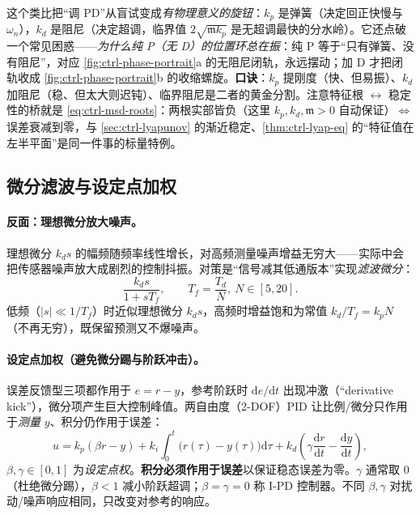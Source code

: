\begin{insight}
这个类比把“调 PD”从盲试变成\emph{有物理意义的旋钮}：$k_p$ 是弹簧（决定回正快慢与 $\omega_n$），$k_d$ 是阻尼（决定超调，临界值 $2\sqrt{\mathfrak m k_p}$ 是无超调最快的分水岭）。它还点破一个常见困惑——\emph{为什么纯 P（无 D）的位置环总在振}：纯 P 等于“只有弹簧、没有阻尼”，对应 \cref{fig:ctrl-phase-portrait}a 的无阻尼闭轨，永远摆动；加 D 才把闭轨收成 \cref{fig:ctrl-phase-portrait}b 的收缩螺旋。\textbf{口诀}：$k_p$ 提刚度（快、但易振）、$k_d$ 加阻尼（稳、但太大则迟钝）、临界阻尼是二者的黄金分割。注意特征根 $\leftrightarrow$ 稳定性的桥就是 \cref{eq:ctrl-msd-roots}：两根实部皆负（这里 $k_p,k_d,\mathfrak m>0$ 自动保证）$\Leftrightarrow$ 误差衰减到零，与 \cref{sec:ctrl-lyapunov} 的渐近稳定、\cref{thm:ctrl-lyap-eq} 的“特征值在左半平面”是同一件事的标量特例。
\end{insight}

\subsection{微分滤波与设定点加权}
\label{sec:ctrl-pid-filter}

\paragraph{反面：理想微分放大噪声。}
理想微分 $k_ds$ 的幅频随频率线性增长，对高频测量噪声增益无穷大——实际中会把传感器噪声放大成剧烈的控制抖振。对策是“信号减其低通版本”实现\emph{滤波微分}\cite{astrom2008feedback}：
\begin{equation}
  \frac{k_ds}{1+sT_f},\qquad T_f=\frac{T_d}{N},\ N\in[5,20].
  \label{eq:ctrl-filt-deriv}
\end{equation}
低频（$|s|\ll1/T_f$）时近似理想微分 $k_ds$，高频时增益饱和为常值 $k_d/T_f=k_pN$（不再无穷），既保留预测又不爆噪声。

\paragraph{设定点加权（避免微分踢与阶跃冲击）。}
误差反馈型三项都作用于 $e=r-y$，参考阶跃时 $\mathrm de/\mathrm dt$ 出现冲激（“derivative kick”），微分项产生巨大控制峰值。两自由度（2-DOF）PID 让比例/微分只作用于\emph{测量} $y$、积分仍作用于误差\cite{astrom2008feedback}：
\begin{equation}
  u=k_p(\beta r-y)+k_i\int_0^t\!\big(r(\tau)-y(\tau)\big)\mathrm d\tau+k_d\!\left(\gamma\frac{\mathrm dr}{\mathrm dt}-\frac{\mathrm dy}{\mathrm dt}\right),
  \label{eq:ctrl-setpoint-weight}
\end{equation}
$\beta,\gamma\in[0,1]$ 为\emph{设定点权}。\textbf{积分必须作用于误差}以保证稳态误差为零。$\gamma$ 通常取 $0$（杜绝微分踢），$\beta<1$ 减小阶跃超调；$\beta=\gamma=0$ 称 I-PD 控制器。不同 $\beta,\gamma$ 对扰动/噪声响应相同，只改变对参考的响应。

